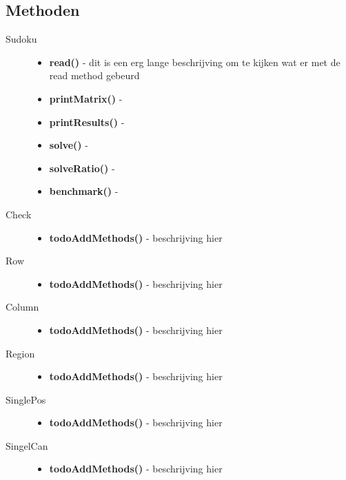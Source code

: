 \documentclass{article}
\begin{document}
\subsection{Methoden}
\begin{description}
    \item[Sudoku] \hfill 
    \begin{itemize}
        \item  \textbf{read()} - dit is een erg lange beschrijving om te kijken wat er met de read method gebeurd
        \item \textbf{printMatrix()} -
        \item \textbf{printResults()} -
        \item \textbf{solve()} - 
        \item \textbf{solveRatio()} - 
        \item \textbf{benchmark()} - 
    \end{itemize}
    \item[Check] \hfill 
    \begin{itemize}
        \item \textbf{todoAddMethods()} - beschrijving hier
    \end{itemize}
    \item[Row] \hfill 
    \begin{itemize}
        \item \textbf{todoAddMethods()} - beschrijving hier
    \end{itemize}
    \item[Column] \hfill 
    \begin{itemize}
        \item \textbf{todoAddMethods()} - beschrijving hier
    \end{itemize}
    \item[Region] \hfill 
    \begin{itemize}
        \item \textbf{todoAddMethods()} - beschrijving hier
    \end{itemize}
    \item[SinglePos] \hfill 
    \begin{itemize}
        \item \textbf{todoAddMethods()} - beschrijving hier
    \end{itemize}
    \item[SingelCan] \hfill 
    \begin{itemize}
        \item \textbf{todoAddMethods()} - beschrijving hier

\end{itemize}
\end{description}
\end{document}
